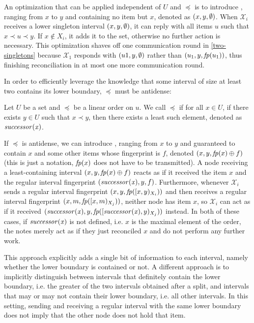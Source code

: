 An optimization that can be applied independent of $U$ and $\preceq$ is to introduce , ranging from $x$ to $y$ and containing no item but $x$, denoted as $({x}, {y}, {\emptyset})$. When $\mathcal{X}_i$ receives a lower singleton interval $({x}, {y}, {\emptyset})$, it can reply with all items $u$ such that $x \prec u \prec y$. If $x \notin X_i$, it adds it to the set, otherwise no further action is necessary. This optimization shaves off one communication round in \cref{two-singletons} because $\mathcal{X}_1$ responds with $({u1}, {y}, {\emptyset})$ rather than $({u_1}, {y}, {\mathit{fp}(u_1)})$, thus finishing reconciliation in at most one more communication round.

In order to efficiently leverage the knowledge that some interval of size at least two contains its lower boundary, $\preceq$ must be antidense:

\begin{definition}
Let $U$ be a set and $\preceq$ be a linear order on $u$. We call $\preceq$  if for all $x \in U$, if there exists $y \in U$ such that $x \prec y$, then there exists a least such element, denoted as $\mathit{successor({x})}$.
\end{definition}

If $\preceq$ is antidense, we can introduce , ranging from $x$ to $y$ and guaranteed to contain $x$ and some other items whose fingerprint is $f$, denoted $({x}, {y}, {{\mathit{fp}(x)} \oplus {f}})$ (this is just a notation, $\mathit{fp}(x)$ does not have to be transmitted). A node receiving a least-containing interval $({x}, {y}, {{\mathit{fp}(x)} \oplus {f}})$ reacts as if it received the item $x$ and the regular interval fingerprint $({\mathit{successor({x})}}, {y}, {f})$. Furthermore, whenever $\mathcal{X}_i$ sends a regular interval fingerprint $({x}, {y}, {\mathit{fp}([{x},{y})_{X_i})})$ and then receives a regular interval fingerprint $({x}, {m}, {\mathit{fp}([{x},{m})_{X_j})})$, neither node has item $x$, so $\mathcal{X}_i$ can act as if it received $({\mathit{successor({x})}}, {y}, {\mathit{fp}([{\mathit{successor({x})}},{y})_{X_j})})$ instead.
In both of these cases, if $\mathit{successor({x})}$ is not defined, i.e. $x$ is the maximal element of the order, the notes merely act as if they just reconciled $x$ and do not perform any further work.

This approach explicitly adds a single bit of information to each interval, namely whether the lower boundary is contained or not. A different approach is to implicitly distinguish between intervals that definitely contain the lower boundary, i.e. the greater of the two intervals obtained after a split, and intervals that may or may not contain their lower boundary, i.e. all other intervals. In this setting, sending and receiving a regular interval with the same lower boundary does not imply that the other node does not hold that item.


